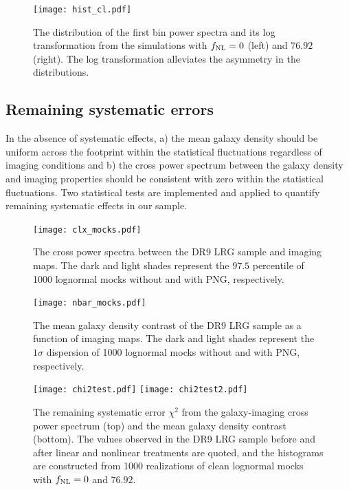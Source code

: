 \begin{figure}
\centering
\texttt{[image: hist\_cl.pdf]}
\caption{The distribution of the first bin power spectra and its log transformation from the simulations with $f_{\rm NL}=0$ (left) and $76.92$ (right). The log transformation alleviates the asymmetry in the distributions.}\label{fig:histcell}
\end{figure}


\subsection{Remaining systematic errors}
\label{ssec:characterization}

In the absence of systematic effects, a) the mean galaxy density should be uniform across the footprint within the statistical fluctuations regardless of imaging conditions and b) the cross power spectrum between the galaxy density and imaging properties should be consistent with zero within the statistical fluctuations. Two statistical tests are implemented and applied to quantify remaining systematic effects in our sample.

\begin{figure}
\centering
\texttt{[image: clx\_mocks.pdf]}
\caption{The cross power spectra between the DR9 LRG sample and imaging maps. The dark and light shades represent the $97.5$ percentile of 1000 lognormal mocks without and with PNG, respectively.}\label{fig:clxmock}
\end{figure}

\begin{figure}
\centering
\texttt{[image: nbar\_mocks.pdf]}
\caption{The mean galaxy density contrast of the DR9 LRG sample as a function of imaging maps. The dark and light shades represent the $1\sigma$ dispersion of 1000 lognormal mocks without and with PNG, respectively.}\label{fig:nbarmock}
\end{figure}


\begin{figure}
\raggedleft
\texttt{[image: chi2test.pdf]}
\texttt{[image: chi2test2.pdf]}
\caption{The remaining systematic error $\chi^{2}$ from the galaxy-imaging cross power spectrum (top) and the mean galaxy density contrast (bottom). The values observed in the DR9 LRG sample before and after linear and nonlinear treatments are quoted, and the histograms are constructed from 1000 realizations of clean lognormal mocks with $f_{\rm NL}=0$ and $76.92$.}\label{fig:chi2test}
\end{figure}


